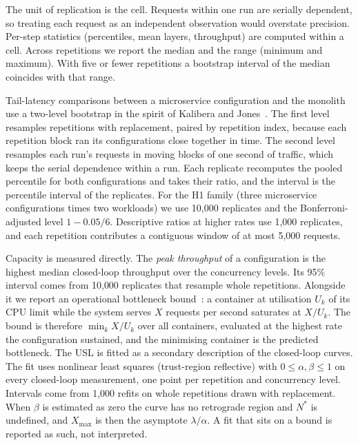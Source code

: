 The unit of replication is the cell. Requests within one run are serially dependent, so treating each request as
an independent observation would overstate precision. Per-step statistics (percentiles, mean layers,
throughput) are computed within a cell. Across repetitions we report the median and the range (minimum and
maximum). With five or fewer repetitions a bootstrap interval of the median coincides with that range.

Tail-latency comparisons between a microservice configuration and the monolith use a two-level bootstrap in the
spirit of Kalibera and Jones~\cite{Kalibera2013}. The first level resamples repetitions with replacement, paired by
repetition index, because each repetition block ran its configurations close together in time. The second level
resamples each run's requests in moving blocks of one second of traffic, which keeps the serial dependence within
a run. Each replicate recomputes the pooled percentile for both configurations and takes their ratio, and the
interval is the percentile interval of the replicates. For the H1 family (three microservice configurations times
two workloads) we use 10{,}000 replicates and the Bonferroni-adjusted level $1 - 0.05/6$. Descriptive ratios at
higher rates use 1{,}000 replicates, and each repetition contributes a contiguous window of at most 5{,}000
requests.

Capacity is measured directly. The \emph{peak throughput} of a configuration is the highest median closed-loop
throughput over the concurrency levels. Its 95\% interval comes from 10{,}000 replicates that resample whole
repetitions. Alongside it we report an operational bottleneck bound~\cite{Denning1978}: a container at utilisation
$U_k$ of its CPU limit while the system serves $X$ requests per second saturates at $X/U_k$. The bound is
therefore $\min_k X/U_k$ over all containers, evaluated at the highest rate the configuration sustained, and the
minimising container is the predicted bottleneck. The USL is fitted as a secondary description of the
closed-loop curves. The fit uses nonlinear least squares (trust-region reflective) with
$0 \le \alpha, \beta \le 1$ on every closed-loop measurement, one point per repetition and concurrency level.
Intervals come from 1{,}000 refits on whole repetitions drawn with replacement. When $\beta$ is estimated as zero
the curve has no retrograde region and $N^\ast$ is undefined, and $X_{\max}$ is then the asymptote
$\lambda/\alpha$. A fit that sits on a bound is reported as such, not interpreted.

